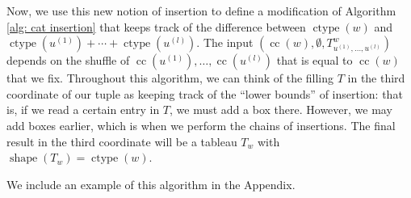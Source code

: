 \documentclass[10pt]{amsart}
\theoremstyle{plain}
\theoremstyle{definition}
\theoremstyle{plain}
\theoremstyle{plain}
\theoremstyle{remark}
\theoremstyle{plain}
\theoremstyle{plain}
\DeclareMathOperator{\ctype}{ctype}
\DeclareMathOperator{\shape}{shape}
\DeclareMathOperator{\cc}{cc}
\begin{document}
Now, we use this new notion of insertion to define a modification of Algorithm \ref{alg: cat insertion} that keeps track of the difference between $\ctype(w)$ and $\ctype(u^{(1)})+ \cdots + \ctype(u^{(l)})$. 
The input $(\cc(w), \emptyset, T^w_{u^{(1)}, \dots, u^{(l)}})$ depends on the shuffle of $\cc(u^{(1)}),\dots, \cc( u^{(l)})$ that is equal to $\cc(w)$ that we fix. Throughout this algorithm, we can think of the filling $T$ in the third coordinate of our tuple as keeping track of the ``lower bounds'' of insertion: that is, if we read a certain entry in $T$, we must add a box there. However, we may add boxes earlier, which is when we perform the chains of insertions.  The final result in the third coordinate will be a tableau $T_w$ with $\shape(T_w) = \ctype(w)$.

We include an example of this algorithm in the Appendix. 
\end{document}
